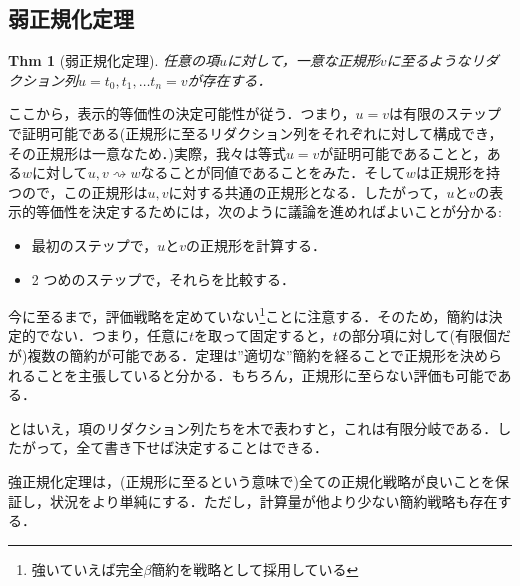 \documentclass[a4paper,10pt,platex, dvipdfmx]{jsarticle}
\newtheorem{thm}{Thm}
\begin{document}
\subsection{弱正規化定理}
\begin{thm}[弱正規化定理]
任意の項$u$に対して，一意な正規形$v$に至るようなリダクション列$u = t_{0},t_{1},\ldots t_{n} = v$が存在する．
\end{thm}
ここから，表示的等価性の決定可能性が従う．つまり，$u = v$は有限のステップで証明可能である(正規形に至るリダクション列をそれぞれに対して構成でき，その正規形は一意なため．)実際，我々は等式$u = v$が証明可能であることと，ある$w$に対して$u, v \rightsquigarrow w$なることが同値であることをみた．そして$w$は正規形を持つので，この正規形は$u, v$に対する共通の正規形となる．したがって，$u$と$v$の表示的等価性を決定するためには，次のように議論を進めればよいことが分かる:
\begin{itemize}
\item 最初のステップで，$u$と$v$の正規形を計算する．
\item 2 つめのステップで，それらを比較する．
\end{itemize}

今に至るまで，評価戦略を定めていない\footnote{強いていえば完全$\beta$簡約を戦略として採用している}ことに注意する．そのため，簡約は決定的でない．つまり，任意に$t$を取って固定すると，$t$の部分項に対して(有限個だが)複数の簡約が可能である．定理は''適切な''簡約を経ることで正規形を決められることを主張していると分かる．もちろん，正規形に至らない評価も可能である．

とはいえ，項のリダクション列たちを木で表わすと，これは有限分岐である．したがって，全て書き下せば決定することはできる．

強正規化定理は，(正規形に至るという意味で)全ての正規化戦略が良いことを保証し，状況をより単純にする．ただし，計算量が他より少ない簡約戦略も存在する．
\end{document}
